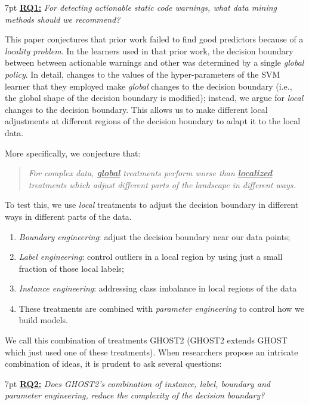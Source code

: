 \documentclass[compsoc,10pt]{IEEEtran}
\newenvironment{formal}{%
  \def\FrameCommand{%
    \hspace{1pt}%
    {\color{darkblue}\vrule width 2pt}%
    {\color{formalshade}\vrule width 4pt}%
    \colorbox{formalshade}%
  }%
  \MakeFramed{\advance\hsize-\width\FrameRestore}%
  \noindent\hspace{-1pt}%
  \begin{adjustwidth}{}{7pt}%
  \vspace{2pt}\vspace{2pt}%
}
{%
  \vspace{3pt}\end{adjustwidth}\endMakeFramed%
}
\newcommand{\rqn}[1]{\underline{\textbf{RQ#1:}}}
\newcommand{\be}{\noindent\begin{enumerate}}
\newcommand{\ee}{\noindent\end{enumerate}}
\newcommand{\respto}[1]{
\fcolorbox{black}{black!15}{%
\label{resp:#1}%
\bf\scriptsize R{#1}}}
\newcommand{\BLUE}{\color{blue}}
\newcommand{\BLACK}{\color{black}}
\begin{document}
 

\begin{formal}\noindent\rqn{1} \textit{For detecting actionable static code warnings,
what data mining methods should we recommend?}
\end{formal}
\noindent
This paper conjectures that prior work failed to find good predictors because of a {\em locality problem}. In the learners
used in that prior work, the decision boundary between  
between actionable warnings and other
was determined by a single {\em global policy}. 
\BLUE \respto{1a11.1} In detail, changes to the values of the hyper-parameters of the SVM learner that they employed make \textit{global} changes to the decision boundary (i.e., the global shape of the decision boundary is modified); instead, we argue for \textit{local} changes to the decision boundary. This allows us to make different local adjustments at different regions of the decision boundary to adapt it to the local data.
\BLACK
 
More specifically, we conjecture  that:
 \begin{quote}
 {\em 
 For complex data, \underline{\bf global} treatments  
   perform worse  than \underline{\bf localized} treatments
 which   adjust different parts of the  landscape in 
 different ways.}
 \end{quote}
 To test this, we use    {\em local} treatments to adjust the decision boundary
  in different ways in different parts of the data.
 \be
\item
{\em Boundary engineering}:  adjust the decision boundary near our data points;
\item
{\em Label engineering}:   control outliers
in a local region by using just a small fraction of those local labels;
\item
{\em Instance engineering}: addressing class imbalance in local regions of the data
\item
These treatments are combined with
{\em parameter engineering}  to control   how we   build models.
 \ee
We call this combination of   treatments
GHOST2 (GHOST2 extends GHOST~\cite{yedida2021value} which just used one of these treatments).  When researchers propose an intricate
combination of 
ideas, it is prudent to ask several questions:
   
\begin{formal}\noindent 
\rqn{2} {\em Does GHOST2's  combination of {\em instance}, {\em label}, {\em boundary}  and {\em parameter} engineering, reduce the complexity of  the decision boundary?}
\end{formal}
\end{document}
